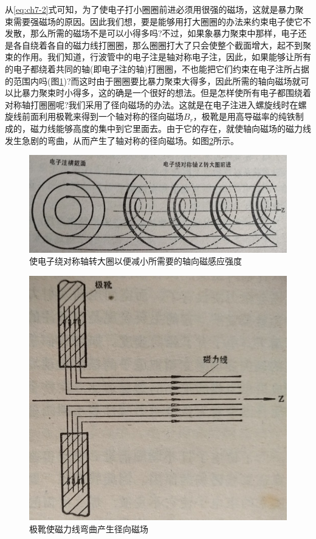 从\ref{eq:ch7-2}式可知，为了使电子打小圈圈前进必须用很强的磁场，这就是暴力聚束需要强磁场的原因。因此我们想，要是能够用打大圈圈的办法来约束电子使它不发散，那么所需的磁场不是可以小得多吗?不过，如果象暴力聚束中那样，电子还是各自绕着各自的磁力线打圈圈，那么圈圈打大了只会使整个截面增大，起不到聚束的作用。我们知道，行波管中的电子注是轴对称电子注，因此，如果能够让所有的电子都绕着共同的轴(即电子注的轴)打圈圈，不也能把它们约束在电子注所占据的范围内吗(图\ref{ch7-7})?而这时由于圈圈要比暴力聚束大得多，因此所需的轴向磁场就可以比暴力聚束时小得多，这的确是一个很好的想法。但是怎样使所有电子都围绕着对称轴打圈圈呢?我们采用了径向磁场的办法。这就是在电子注进入螺旋线时在螺旋线前面利用极靴来得到一个轴对称的径向磁场$ B_r $，极靴是用高导磁率的纯铁制成的，磁力线能够高度的集中到它里面去。由于它的存在，就使轴向磁场的磁力线发生急剧的弯曲，从而产生了轴对称的径向磁场。如图\ref{ch7-8}所示。

\begin{figure}[phtb]
	\centering
	\includegraphics[width=0.85\linewidth]{figure/ch7-7}
	\caption{使电子绕对称轴转大圈以便减小所需要的轴向磁感应强度}
	\label{ch7-7}
\end{figure}

\begin{figure}[phtb]
	\centering
	\includegraphics[width=0.65\linewidth]{figure/ch7-8}
	\caption{极靴使磁力线弯曲产生径向磁场}
	\label{ch7-8}
\end{figure}

